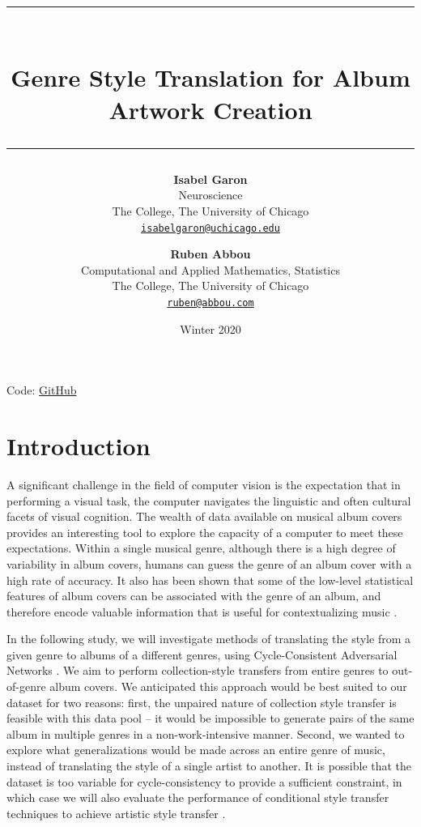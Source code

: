 \documentclass{article}
\title{\vspace*{-15pt}\bf \Large \rule{\linewidth}{1pt}\\Genre Style Translation for Album Artwork Creation
\\ \rule{\linewidth}{2pt}}
\author{\textbf{Isabel Garon}\\ Neuroscience \\ The College, The University of Chicago \\ \texttt{\href{mailto: isabelgaron@uchicago.edu}{isabelgaron@uchicago.edu}}\and
\textbf{Ruben Abbou} \\ Computational and Applied Mathematics, Statistics \\ The College, The University of Chicago \\
\texttt{\href{mailto: ruben@abbou.com}{ruben@abbou.com}}}
\date{Winter 2020}
\begin{document}
\maketitle
\thispagestyle{header}

\begin{center}
Code: \href{https://github.com/rabbou/GenreToAlbumArtworkTranslation}{GitHub}
\end{center}

\section{Introduction}

A significant challenge in the field of computer vision is the expectation that in performing a visual task, the computer navigates the linguistic and often cultural facets of visual cognition. The wealth of data available on musical album covers provides an interesting tool to explore the capacity of a computer to meet these expectations. Within a single musical genre, although there is a high degree of variability in album covers, humans can guess the genre of an album cover with a high rate of accuracy. It also has been shown that some of the low-level statistical features of album covers can be associated with the genre of an album, and therefore encode valuable information that is useful for contextualizing music \cite{5696720}.
\par In the following study, we will investigate methods of translating the style from a given genre to albums of a different genres, using Cycle-Consistent Adversarial Networks \cite{DBLP:journals/corr/ZhuPIE17}. We aim to perform collection-style transfers from entire genres to out-of-genre album covers. We anticipated this approach would be best suited to our dataset for two reasons: first, the unpaired nature of collection style transfer is feasible with this data pool – it would be impossible to generate pairs of the same album in multiple genres in a non-work-intensive manner. Second, we wanted to explore what generalizations would be made across an entire genre of music, instead of translating the style of a single artist to another.
It is possible that the dataset is too variable for cycle-consistency to provide a sufficient constraint, in which case we will also evaluate the performance of conditional style transfer techniques to achieve artistic style transfer \cite{DBLP:journals/corr/GatysEB15a}.
\end{document}
